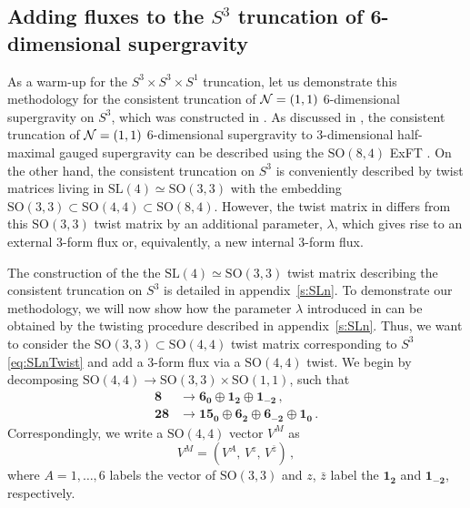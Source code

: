 \documentclass[a4paper, 11pt]{article}
\numberwithin{equation}{section}
\newcommand{\SL}[1]{\mathrm{SL}( #1 )}
\newcommand{\SO}[1]{\mathrm{SO}( #1 )}
\newcommand{\+}{\oplus}
\begin{document}
\subsection{Adding fluxes to the $S^3$ truncation of 6-dimensional supergravity} \label{s:S3Flux}
As a warm-up for the $S^3 \times S^3 \times S^1$ truncation, let us demonstrate this methodology for the consistent truncation of ${\cal N}=(1,1)$ 6-dimensional supergravity on $S^3$, which was constructed in \cite{Eloy:2021fhc}. As discussed in \cite{Eloy:2021fhc}, the consistent truncation of ${\cal N}=(1,1)$ 6-dimensional supergravity to 3-dimensional half-maximal gauged supergravity can be described using the $\SO{8,4}$ ExFT \cite{Hohm:2017wtr,Samtleben:2019zrh}. On the other hand, the consistent truncation on $S^3$ is conveniently described by twist matrices living in $\SL{4} \simeq \SO{3,3}$ \cite{Lee:2014mla,Hohm:2014qga,Baguet:2015iou} with the embedding $\SO{3,3} \subset \SO{4,4} \subset \SO{8,4}$. However, the twist matrix in \cite{Eloy:2021fhc} differs from this $\SO{3,3}$ twist matrix \cite{Lee:2014mla,Hohm:2014qga,Baguet:2015iou} by an additional parameter, $\lambda$, which gives rise to an external 3-form flux or, equivalently, a new internal 3-form flux.

The construction of the the $\SL{4} \simeq \SO{3,3}$ twist matrix describing the consistent truncation on $S^3$ is detailed in appendix~\ref{s:SLn}. To demonstrate our methodology, we will now show how the parameter $\lambda$ introduced in \cite{Eloy:2021fhc} can be obtained by the twisting procedure described in appendix~\ref{s:SLn}. Thus, we want to consider the $\SO{3,3} \subset \SO{4,4}$ twist matrix corresponding to $S^3$ \eqref{eq:SLnTwist} and add a 3-form flux via a $\SO{4,4}$ twist. We begin by decomposing $\SO{4,4} \rightarrow \SO{3,3} \times \SO{1,1}$, such that
\begin{equation}
	\begin{split}
		\mathbf{8} &\rightarrow \mathbf{6_0} \oplus \mathbf{1_2} \oplus \mathbf{1_{-2}} \,, \\
		\mathbf{28} &\rightarrow \mathbf{15_0} \oplus \mathbf{6_2} \oplus \mathbf{6_{-2}} \oplus \mathbf{1_0} \,.
	\end{split}
\end{equation}
Correspondingly, we write a $\SO{4,4}$ vector $V^M$ as
\begin{equation}
	V^M = \left( V^A,\, V^z,\, V^{\bar{z}} \right) \,,
\end{equation}
where $A = 1, \ldots, 6$ labels the vector of $\SO{3,3}$ and $z$, $\bar{z}$ label the $\mathbf{1_2}$ and $\mathbf{1_{-2}}$, respectively.
\end{document}
